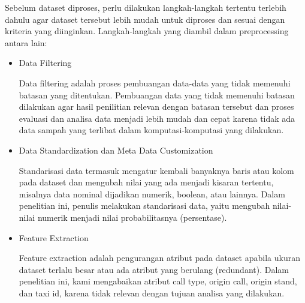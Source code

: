 \documentclass{article}
\begin{document}
\begin{adjustwidth}{4em}{0pt}

\hspace{\parindent}Sebelum dataset diproses, perlu dilakukan langkah-langkah tertentu terlebih dahulu agar dataset tersebut lebih mudah untuk diproses dan sesuai dengan kriteria yang diinginkan. Langkah-langkah yang diambil dalam preprocessing antara lain:

\begin{itemize}
	\item{Data Filtering}
		
		Data filtering adalah proses pembuangan data-data yang tidak memenuhi batasan yang ditentukan. Pembuangan data yang tidak memenuhi batasan dilakukan agar hasil penilitian relevan dengan batasan tersebut dan proses evaluasi dan analisa data menjadi lebih mudah dan cepat karena tidak ada data sampah yang terlibat dalam komputasi-komputasi yang dilakukan.
		
	\item{Data Standardization dan Meta Data Customization}
		
		Standarisasi data termasuk mengatur kembali banyaknya baris atau kolom pada dataset dan mengubah nilai yang ada menjadi kisaran tertentu, misalnya data nominal dijadikan numerik, boolean, atau lainnya. Dalam penelitian ini, penulis melakukan standarisasi data, yaitu mengubah nilai-nilai numerik menjadi nilai probabilitasnya (persentase).
		
	\item{Feature Extraction}
		
		Feature extraction adalah pengurangan atribut pada dataset apabila ukuran dataset terlalu besar atau ada atribut yang berulang (redundant). Dalam penelitian ini, kami mengabaikan atribut call type, origin call, origin stand, dan taxi id, karena tidak relevan dengan tujuan analisa yang dilakukan.
		
\end{itemize}

\end{adjustwidth}
\end{document}
